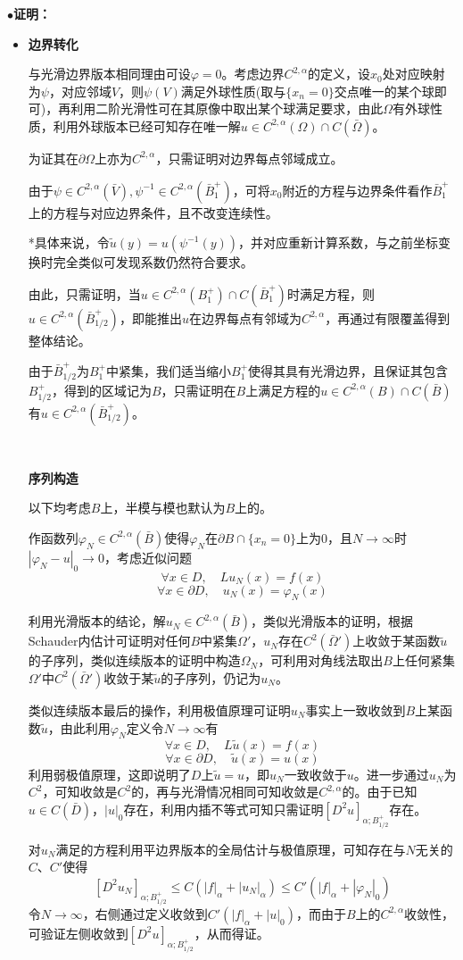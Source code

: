 \documentclass[a4paper,UTF8,fontset=windows,AutoFakeBold]{ctexart}
\newcommand{\proo}[1]{{\kaishu $\bullet$\textbf{证明：}
\begin{itemize}
    \item[] #1
\end{itemize}
}}
\begin{document}
\proo{
    \textbf{边界转化}

    与光滑边界版本相同理由可设$\varphi=0$。考虑边界$C^{2,\alpha}$的定义，设$x_0$处对应映射为$\psi$，对应邻域$V$，则$\psi(V)$满足外球性质(取与$\{x_n=0\}$交点唯一的某个球即可)，再利用二阶光滑性可在其原像中取出某个球满足要求，由此$\Omega$有外球性质，利用外球版本已经可知存在唯一解$u\in C^{2,\alpha}(\Omega)\cap C(\bar\Omega)$。

    为证其在$\partial\Omega$上亦为$C^{2,\alpha}$，只需证明对边界每点邻域成立。

    由于$\psi\in C^{2,\alpha}(\bar{V}),\psi^{-1}\in C^{2,\alpha}(\bar{B}_1^+)$，可将$x_0$附近的方程与边界条件看作$\bar{B}_1^+$上的方程与对应边界条件，且不改变连续性。

    *具体来说，令$\tilde{u}(y)=u(\psi^{-1}(y))$，并对应重新计算系数，与之前坐标变换时完全类似可发现系数仍然符合要求。

    由此，只需证明，当$u\in C^{2,\alpha}(B_1^+)\cap C(\bar{B}_1^+)$时满足方程，则$u\in C^{2,\alpha}(\bar{B}_{1/2}^+)$，即能推出$u$在边界每点有邻域为$C^{2,\alpha}$，再通过有限覆盖得到整体结论。

    由于$\bar{B}_{1/2}^+$为$B_1^+$中紧集，我们适当缩小$B_1^+$使得其具有光滑边界，且保证其包含$B_{1/2}^+$，得到的区域记为$B$，只需证明在$B$上满足方程的$u\in C^{2,\alpha}(B)\cap C(\bar{B})$有$u\in C^{2,\alpha}(\bar{B}_{1/2}^+)$。

    \

    \textbf{序列构造}

    以下均考虑$B$上，半模与模也默认为$B$上的。

    作函数列$\varphi_N\in C^{2,\alpha}(\bar{B})$使得$\varphi_N$在$\partial B\cap\{x_n=0\}$上为0，且$N\to\infty$时$|\varphi_N-u|_0\to 0$，考虑近似问题
    $$\forall x\in D,\quad Lu_N(x)=f(x)$$
    $$\forall x\in\partial D,\quad u_N(x)=\varphi_N(x)$$

    利用光滑版本的结论，解$u_N\in C^{2,\alpha}(\bar{B})$，类似光滑版本的证明，根据Schauder内估计可证明对任何$B$中紧集$\Omega'$，$u_N$存在$C^2(\bar\Omega')$上收敛于某函数$\tilde{u}$的子序列，类似连续版本的证明中构造$\Omega_N$，可利用对角线法取出$B$上任何紧集$\Omega'$中$C^2(\bar\Omega')$收敛于某$\tilde{u}$的子序列，仍记为$u_N$。

    类似连续版本最后的操作，利用极值原理可证明$u_N$事实上一致收敛到$B$上某函数$\tilde{u}$，由此利用$\varphi_N$定义令$N\to\infty$有
    $$\forall x\in D,\quad L\tilde{u}(x)=f(x)$$
    $$\forall x\in\partial D,\quad \tilde{u}(x)=u(x)$$
    利用弱极值原理，这即说明了$D$上$\tilde{u}=u$，即$u_N$一致收敛于$u$。进一步通过$u_N$为$C^2$，可知收敛是$C^2$的，再与光滑情况相同可知收敛是$C^{2,\alpha}$的。由于已知$u\in C(\bar{D})$，$|u|_0$存在，利用内插不等式可知只需证明$[D^2u]_{\alpha;B_{1/2}^+}$存在。

    对$u_N$满足的方程利用平边界版本的全局估计与极值原理，可知存在与$N$无关的$C$、$C'$使得
    $$[D^2u_N]_{\alpha;B_{1/2}^+}\le C(|f|_\alpha+|u_N|_\alpha)\le C'(|f|_\alpha+|\varphi_N|_0)$$
    令$N\to\infty$，右侧通过定义收敛到$C'(|f|_\alpha+|u|_0)$，而由于$B$上的$C^{2,\alpha}$收敛性，可验证左侧收敛到$[D^2u]_{\alpha;B_{1/2}^+}$，从而得证。
}
\end{document}
